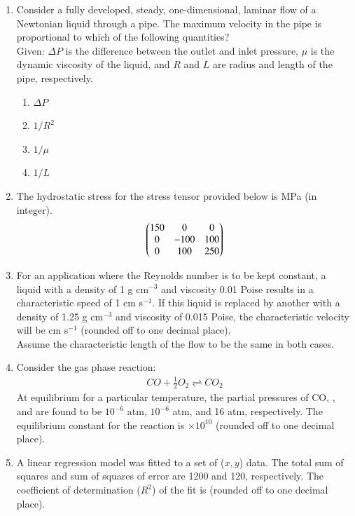 \documentclass[journal]{IEEEtran}
\theoremstyle{remark}
\begin{document}
\begin{enumerate}[resume]
\item Consider a fully developed, steady, one-dimensional, laminar flow of a Newtonian liquid through a pipe. The maximum velocity in the pipe is proportional to which of the following quantities? \hfill{} \\
Given: $\Delta P$ is the difference between the outlet and inlet pressure, $\mu$ is the dynamic viscosity of the liquid, and $R$ and $L$ are radius and length of the pipe, respectively.
\begin{multicols}{4}
\begin{enumerate}
\item $\Delta P$
\item $1/R^2$
\item $1/\mu$
\item $1/L$
\end{enumerate}
\end{multicols}

\item The hydrostatic stress for the stress tensor provided below is \underline{\hspace{2cm}} MPa (in integer). \hfill{}
\begin{align}
    \begin{pmatrix}
150 & 0 & 0 \\
0 & -100 & 100 \\
0 & 100 & 250\end{pmatrix}
\end{align}

\item For an application where the Reynolds number is to be kept constant, a liquid with a density of 1 g cm$^{-3}$ and viscosity 0.01 Poise results in a characteristic speed of 1 cm s$^{-1}$. If this liquid is replaced by another with a density of 1.25 g cm$^{-3}$ and viscosity of 0.015 Poise, the characteristic velocity will be \underline{\hspace{2cm}} cm s$^{-1}$ (rounded off to one decimal place). \hfill{} \\
Assume the characteristic length of the flow to be the same in both cases.

\item Consider the gas phase reaction: \hfill{} 
\begin{align}
CO + \frac{1}{2}O_2 \rightleftharpoons CO_2
\end{align}
At equilibrium for a particular temperature, the partial pressures of CO, , and  are found to be $10^{-6}$ atm, $10^{-6}$ atm, and 16 atm, respectively. The equilibrium constant for the reaction is \underline{\hspace{2cm}} $\times 10^{10}$ (rounded off to one decimal place).

\item A linear regression model was fitted to a set of ($x, y$) data. The total sum of squares and sum of squares of error are 1200 and 120, respectively. The coefficient of determination ($R^2$) of the fit is \underline{\hspace{2cm}} (rounded off to one decimal place). \hfill{}
\end{enumerate}
\end{document}
